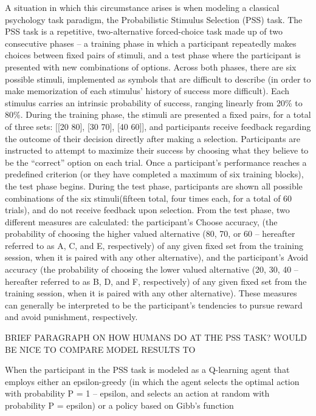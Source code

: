 \documentclass[10pt,letterpaper]{article}
\begin{document}
A situation in which this circumstance arises is when modeling a classical psychology task paradigm, the Probabilistic Stimulus Selection (PSS) task. The PSS task is a repetitive, two-alternative forced-choice task made up of two consecutive phases – a training phase in which a participant repeatedly makes choices between fixed pairs of stimuli, and a test phase where the participant is presented with new combinations of options. Across both phases, there are six possible stimuli, implemented as symbols that are difficult to describe (in order to make memorization of each stimulus’ history of success more difficult). Each stimulus carries an intrinsic probability of success, ranging linearly from 20\% to 80\%. During the training phase, the stimuli are presented a fixed pairs, for a total of three sets: [[20 80], [30 70], [40 60]], and participants receive feedback regarding the outcome of their decision directly after making a selection. Participants are instructed to attempt to maximize their success by choosing what they believe to be the “correct” option on each trial. Once a participant’s performance reaches a predefined criterion (or they have completed a maximum of six training blocks), the test phase begins. During the test phase, participants are shown all possible combinations of the six stimuli(fifteen total, four times each, for a total of 60 trials), and do not receive feedback upon selection. From the test phase, two different measures are calculated: the participant’s Choose accuracy, (the probability of choosing the higher valued alternative (80, 70, or 60 – hereafter referred to as A, C, and E, respectively) of any given fixed set from the training session, when it is paired with any other alternative), and the participant’s Avoid accuracy (the probability of choosing the lower valued alternative (20, 30, 40 – hereafter referred to as B, D, and F, respectively) of any given fixed set from the training session, when it is paired with any other alternative). These measures can generally be interpreted to be the participant’s tendencies to pursue reward and avoid punishment, respectively.

BRIEF PARAGRAPH ON HOW HUMANS DO AT THE PSS TASK? WOULD BE NICE TO COMPARE MODEL RESULTS TO

When the participant in the PSS task is modeled as a Q-learning agent that employs either an epsilon-greedy (in which the agent selects the optimal action with probability P = 1 – epsilon, and selects an action at random with probability P = epsilon) or a policy based on Gibb’s function 
\end{document}
